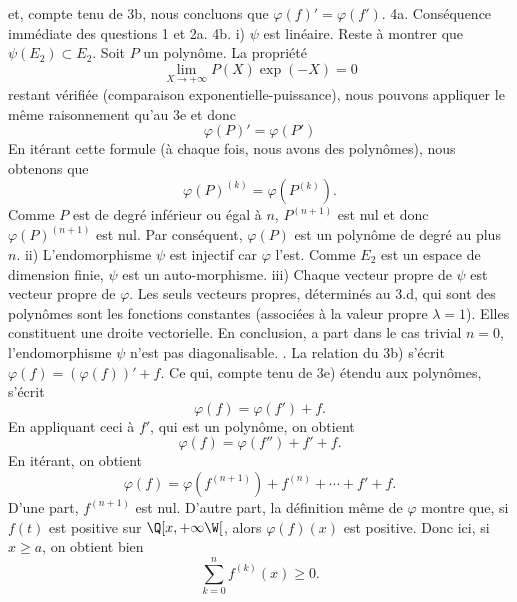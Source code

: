 et, compte tenu de 3b, nous concluons que $\varphi (f)'=\varphi (f')$.
\bigskip
\noindent
4a. Cons\'equence imm\'ediate des questions 1 et 2a.
\bigskip
\noindent
4b.
i)  $\psi$ est lin\'eaire. Reste \`a montrer que $\psi(E_{2})\subset E_{2}$. \pn
Soit $P$ un polyn\^ome. La propri\'et\'e 
$$
\lim_{X\to+\infty}P(X)\exp(-X)=0
$$ 
restant v\'erifi\'ee (comparaison exponentielle-puissance), nous pouvons appliquer le m\^eme raisonnement qu'au 3e et donc
$$
\varphi (P)'=\varphi (P')
$$
En it\'erant cette formule (\`a chaque fois, nous avons des polyn\^omes), nous obtenons que
$$
\varphi (P)^{(k)}=\varphi(P^{(k)}).
$$
Comme $P$ est de degr\'e inf\'erieur ou \'egal \`a $n$, $P^{(n+1)}$ est nul et donc $\varphi(P)^{(n+1)}$ est nul. Par cons\'equent, 
$\varphi(P)$ est un polyn\^ome de degr\'e au plus $n$.
\bigskip
\noindent ii) L'endomorphisme $\psi$  est injectif car $\varphi$ l'est. Comme $E_{2}$ est un espace de dimension finie,  $\psi$ est un auto-morphisme. 
\bigskip
\noindent
iii) Chaque vecteur propre de $\psi $ est vecteur propre de $\varphi $.
Les seuls vecteurs propres, d\'etermin\'es au 3.d, qui sont des polyn\^omes sont les fonctions constantes (associ\'ees \`a la valeur propre $\lambda =1$). Elles constituent une droite vectorielle. \pn
En conclusion, a part dans le cas trivial $n=0$, l'endomorphisme $\psi $ n'est pas diagonalisable.
\bigskip
{}. La relation du 3b) s'\'ecrit $\varphi (f)=(\varphi (f))'+f$. Ce qui, compte tenu de 3e) \'etendu aux polyn\^omes, s'\'ecrit
$$
\varphi (f)=\varphi (f')+f.
$$
En appliquant ceci \`a $f'$, qui est un polyn\^ome, on obtient
$$
\varphi (f)=\varphi (f'')+f'+f.
$$
En it\'erant, on obtient
$$
\varphi(f)=\varphi(f^{(n+1)})+f^{(n)}+\cdots+f'+f.
$$
D'une part, $f^{(n+1)}$ est nul. D'autre part, la d\'efinition m\^eme de $\varphi $ montre que, si $f(t)$ est positive sur $
\Q[x,+\infty\W[$, alors $\varphi (f)(x)$ est positive. Donc ici, si $x\ge a$, on obtient bien
$$
\sum_{k=0}^{n} f^{(k)}(x)\ge 0.
$$

\bye